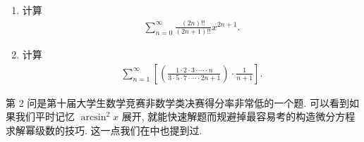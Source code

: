 \documentclass[../../main.tex]{subfiles}
\begin{document}
\begin{example}
\begin{enumerate}
\item 计算
\begin{align*}
\sum_{n=0}^{\infty} \frac{(2n)!!}{(2n + 1)!!} x^{2n + 1}.
\end{align*}
\item 计算
\begin{align*}
\sum_{n=1}^{\infty} \left[ \left( \frac{1 \cdot 2 \cdot 3 \cdot \cdots \cdot n}{3 \cdot 5 \cdot 7 \cdot \cdots \cdot 2n + 1} \right) \cdot \frac{1}{n + 1} \right].
\end{align*}
\end{enumerate}
\end{example}
\begin{remark}
第 2 问是第十届大学生数学竞赛非数学类决赛得分率非常低的一个题. 可以看到如果我们平时记忆 $\arcsin^2 x$ 展开, 就能快速解题而规避掉最容易考的构造微分方程求解幂级数的技巧. 这一点我们在中也提到过.
\end{remark}
\end{document}
